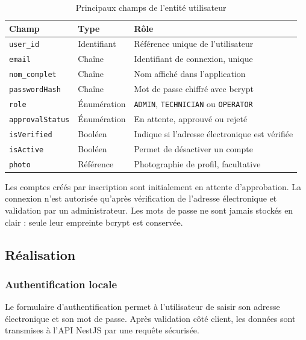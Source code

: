 \begin{table}[H]
\centering
\caption{Principaux champs de l'entité utilisateur}
\label{tab:modele-user}
\small
\begin{tabularx}{\textwidth}{|p{3.4cm}|p{2.5cm}|X|}
\hline
\textbf{Champ} & \textbf{Type} & \textbf{Rôle} \\
\hline
\texttt{user\_id} & Identifiant & Référence unique de l'utilisateur \\
\hline
\texttt{email} & Chaîne & Identifiant de connexion, unique \\
\hline
\texttt{nom\_complet} & Chaîne & Nom affiché dans l'application \\
\hline
\texttt{passwordHash} & Chaîne & Mot de passe chiffré avec bcrypt \\
\hline
\texttt{role} & Énumération & \texttt{ADMIN}, \texttt{TECHNICIAN} ou \texttt{OPERATOR} \\
\hline
\texttt{approvalStatus} & Énumération & En attente, approuvé ou rejeté \\
\hline
\texttt{isVerified} & Booléen & Indique si l'adresse électronique est vérifiée \\
\hline
\texttt{isActive} & Booléen & Permet de désactiver un compte \\
\hline
\texttt{photo} & Référence & Photographie de profil, facultative \\
\hline
\end{tabularx}
\end{table}

Les comptes créés par inscription sont initialement en attente d'approbation. La connexion n'est autorisée qu'après vérification de l'adresse électronique et validation par un administrateur. Les mots de passe ne sont jamais stockés en clair : seule leur empreinte bcrypt est conservée.

\subsection{Réalisation}

\subsubsection{Authentification locale}

Le formulaire d'authentification permet à l'utilisateur de saisir son adresse électronique et son mot de passe. Après validation côté client, les données sont transmises à l'API NestJS par une requête sécurisée.

